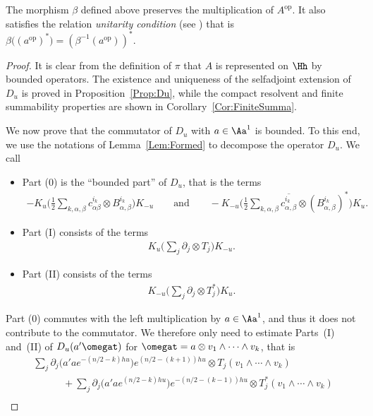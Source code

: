 \begin{Remark}
The morphism $\beta$ def\/ined above preserves the multiplication of $A^\text{op}$. It also satisf\/ies the relation \emph{unitarity condition} (see \cite[equation~(3.4)]{TrSpTypeIII}) that is $\beta\big( (a^\text{op})^* \big) = (\beta^{-1}(a^\text{op}))^*$.
\end{Remark}

\begin{proof}
It is clear from the def\/inition of $\pi$ that $A$ is represented on $\Hh$ by bounded operators. The existence and uniqueness of the selfadjoint extension of $D_u$ is proved in Proposition~\ref{Prop:Du}, while the compact resolvent and f\/inite summability properties are shown in Corollary~\ref{Cor:FiniteSumma}.

We now prove that the commutator of $D_u$ with $a \in \Aa^1$ is bounded. To this end, we use the notations of Lemma~\ref{Lem:Formed} to decompose the operator $D_u$. We call
\begin{itemize}\itemsep=0pt
\item
Part (0) is the ``bounded part'' of $D_u$, that is the terms
\begin{gather*}
 - K_u \bigg( \frac{1}{2} \sum_{k,\alpha,\beta} c^{i_k}_{\alpha \beta} \otimes B^{i_k}_{\alpha,\beta} \bigg) K_{-u}
\qquad
\text{and}
\qquad
- K_{-u} \bigg( \frac{1}{2} \sum_{k,\alpha,\beta} \overline{c^{i_k}_{\alpha, \beta}} \otimes (B^{i_k}_{\alpha, \beta})^* \bigg) K_{u}.
\end{gather*}
\item
Part (I) consists of the terms
\begin{gather*}
K_u \bigg( \sum_{j} \partial _j \otimes T_j \bigg) K_{-u}.
\end{gather*}
\item
Part (II) consists of the terms
\begin{gather*}
K_{-u} \bigg( \sum_{j} \partial _j \otimes T_j^* \bigg) K_{u}.
\end{gather*}
\end{itemize}
Part (0) commutes with the left multiplication by $a \in \Aa^1$, and thus it does not contribute to the commutator. We therefore only need to estimate Parts~(I) and~(II) of $D_u( a' \omegat)$ for $\omegat = a \otimes v_1 \wedge \cdots \wedge v_k$, that is
\begin{gather*}
\sum_j \partial_j\big( a' a e^{-(n/2 - k)h u} \big) e^{(n/2 - (k+1))h u} \otimes T_j( v_1 \wedge \cdots \wedge v_k) \\
\qquad\quad{}
+ \sum_j \partial_j\big( a' a e^{(n/2 - k)h u} \big) e^{-(n/2 - (k-1))h u} \otimes T_j^*( v_1 \wedge \cdots \wedge v_k)\\

\end{gather*}
\end{proof}
